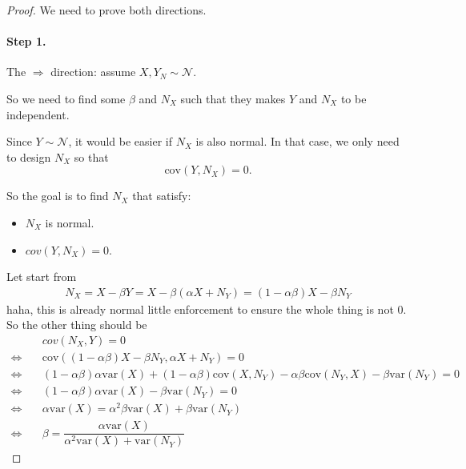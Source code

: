 \documentclass[11pt,a4paper]{article}
\theoremstyle{plain}
\theoremstyle{definition}
\theoremstyle{remark}
\begin{document}
\begin{proof}
We need to prove both directions.

\paragraph{Step 1.} The $\Rightarrow $ direction: assume $X, Y_N \sim \mathcal{N}$.

So we need to find some $\beta$ and $N_X$ such that they makes $Y$ and  $N_X$ to be independent.

Since $Y \sim \mathcal{N}$, it would be easier if $N_X$ is also normal. In that case, we only need to design $N_X$ so that  
\[
\text{cov}(Y, N_X) = 0.
\]

So the goal is to find $N_X$ that satisfy:
 \begin{itemize}
    \item $N_X$ is normal.
    \item  $ cov(Y, N_X) = 0$.
\end{itemize}
Let start from
\begin{align*}
N_X  = X - \beta Y = X - \beta (\alpha X + N_Y) = (1 - \alpha \beta ) X  - \beta N_Y
\end{align*}
haha, this is already normal little enforcement to ensure the whole thing is not $0$. So the other thing should be
\begin{align*}
\quad &cov(N_X, Y) = 0 \\
\Leftrightarrow \quad & \text{cov}((1-\alpha \beta ) X - \beta N_Y , \alpha X + N_Y) = 0 \\
\Leftrightarrow \quad & (1-\alpha \beta) \alpha \text{var}(X) + (1- \alpha \beta) \text{cov}(X, N_Y)
- \alpha \beta \text{cov}(N_Y, X) - \beta \text{var}(N_Y) = 0 \\
\Leftrightarrow \quad & (1- \alpha \beta) \alpha \text{var}(X) - \beta \text{var}(N_Y) = 0 \\
\Leftrightarrow \quad & \alpha \text{var}(X) = \alpha^2 \beta \text{var}(X) + \beta \text{var}(N_Y)  \\
\Leftrightarrow \quad & \beta = \dfrac{ \alpha \text{var}(X)}{\alpha^2 \text{var}(X) + \text{var}(N_Y)}
\end{align*}



\end{proof}
\end{document}
